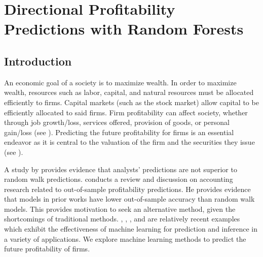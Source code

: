 \chapter{Directional Profitability Predictions with Random Forests} \label{Chapter:ABIS}

\section{Introduction}


An economic goal of a society is to maximize wealth. In order to maximize wealth, resources such as labor, capital, and natural resources must be allocated efficiently to firms. Capital markets (such as the stock market) allow capital to be efficiently allocated to said firms. Firm profitability can affect society, whether through job growth/loss, services offered, provision of goods, or personal gain/loss (see \cite{IntAccBook}).  Predicting the future profitability for firms is an essential endeavor as it is central to the valuation of the firm and the securities they issue (see \cite{Monahan}). 

A study by \cite{Bradshaw} provides evidence that analysts' predictions are not superior to random walk predictions. \cite{Monahan} conducts a review and discussion on accounting research related to out-of-sample profitability predictions.  He provides evidence that models in prior works have lower out-of-sample accuracy than random walk models. This provides motivation to seek an alternative method, given the shortcomings of traditional methods.   \cite{ABIS:ML:EX1},  \cite{ABIS:ML:EX2},  \cite{ABIS:ML:EX3},  and \cite{ABIS:ML:EX4} are relatively recent examples which exhibit the effectiveness of machine learning for prediction and inference in a variety of applications.  We explore machine learning methods to predict the future profitability of firms.
 
